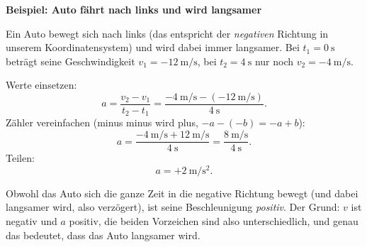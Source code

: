 \documentclass[addpoints,11pt,a4paper]{exam}
\newenvironment{beispielbox}[1][Beispiel]{%
  \par\addvspace{10pt}\noindent\textbf{#1}\par\smallskip\noindent
}{%
  \par\addvspace{10pt}
}
\begin{document}
\begin{beispielbox}[Beispiel: Auto fährt nach links und wird langsamer]
Ein Auto bewegt sich nach links (das entspricht der \emph{negativen}
Richtung in unserem Koordinatensystem) und wird dabei immer langsamer.
Bei $t_1=\SI{0}{\second}$ beträgt seine Geschwindigkeit
$v_1=-\SI{12}{\meter\per\second}$, bei $t_2=\SI{4}{\second}$ nur noch
$v_2=-\SI{4}{\meter\per\second}$.

\begin{center}
\end{center}

Werte einsetzen:
\[
  a = \frac{v_2 - v_1}{t_2 - t_1} = \frac{-\SI{4}{\meter\per\second} - (-\SI{12}{\meter\per\second})}{\SI{4}{\second}}.
\]
Zähler vereinfachen (\glqq minus minus\grqq{} wird \glqq plus\grqq{},
$-a-(-b)=-a+b$):
\[
  a = \frac{-\SI{4}{\meter\per\second} + \SI{12}{\meter\per\second}}{\SI{4}{\second}}
    = \frac{\SI{8}{\meter\per\second}}{\SI{4}{\second}}.
\]
Teilen:
\[
  a = +\SI{2}{\meter\per\second\squared}.
\]

Obwohl das Auto sich die ganze Zeit in die negative Richtung bewegt (und
dabei langsamer wird, also verzögert), ist seine Beschleunigung
\emph{positiv}. Der Grund: $v$ ist negativ und $a$ positiv, die beiden
Vorzeichen sind also unterschiedlich, und genau das bedeutet, dass das
Auto langsamer wird.
\end{beispielbox}
\end{document}
